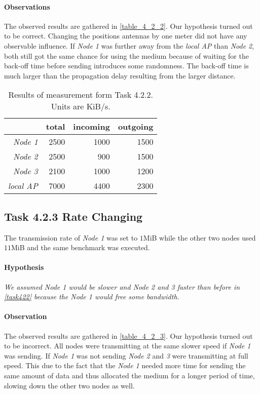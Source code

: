 \documentclass[12pt,a4paper]{article}
\begin{document}
\paragraph{Observations}
The observed results are gathered in \autoref{table_4_2_2}.
Our hypothesis turned out to be correct.
Changing the positions antennas by one meter did not have any observable influence. If \emph{Node 1} was further away from the \emph{local AP} than \emph{Node 2}, both still got the same chance for using the medium because of waiting for the back-off time before sending introduces some randomness. The back-off time is much larger than the propagation delay resulting from the larger distance.

	\begin{table}
	\begin{center}
		\begin{tabular}{r|r|r|r}\
		 & total & incoming & outgoing \\
		 \hline 
		 \emph{Node 1} & 2500 & 1000 & 1500 \\
		 \emph{Node 2} & 2500 & 900 & 1500 \\
		 \emph{Node 3} & 2100 & 1000 & 1200 \\
		 \emph{local AP} & 7000 & 4400& 2300\\
		\end{tabular}
		\label{table_4_2_2}
		\caption{Results of measurement form Task 4.2.2. Units are KiB/s.}
		
	\end{center}
	\end{table}


\subsection{Task 4.2.3 Rate Changing}
The transmission rate of \emph{Node 1} was set to $1$MiB while the other two nodes used $11$MiB and the same benchmark was executed.

\paragraph{Hypothesis}
\emph{We assumed \emph{Node 1} would be slower and \emph{Node 2} and \emph{3} faster than before in \autoref{task422} because the \emph{Node 1} would free some bandwidth.}

\paragraph{Observation}
The observed results are gathered in \autoref{table_4_2_3}.
Our hypothesis turned out to be incorrect.
All nodes were transmitting at the same slower speed if \emph{Node 1} was sending.
If \emph{Node 1} was not sending \emph{Node 2} and \emph{3} were transmitting at full speed.
This due to the fact that the \emph{Node 1} needed more time for sending the same amount of data and thus allocated the medium for a longer period of time, slowing down the other two nodes as well.
\end{document}
